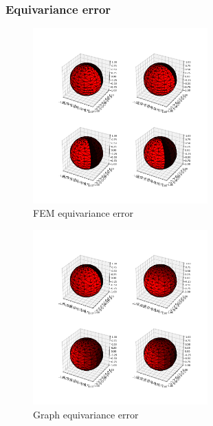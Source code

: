 \subsubsection{Equivariance error}

\begin{figure}[h]
	\label{fig:FEM equivariance error}
	\centering
	\includegraphics[width=0.6\textwidth]{../codes/03.FEM_laplacian/equiangular/normal/img/equivariance_error_FEM.png}
	\caption{FEM equivariance error}
\end{figure}
\begin{figure}[h]
	\label{fig:GRAPH equivariance error}
	\centering
	\includegraphics[width=0.6\textwidth]{../codes/03.FEM_laplacian/equiangular/normal/img/equivariance_error_GRAPH.png}
	\caption{Graph equivariance error}
\end{figure}



